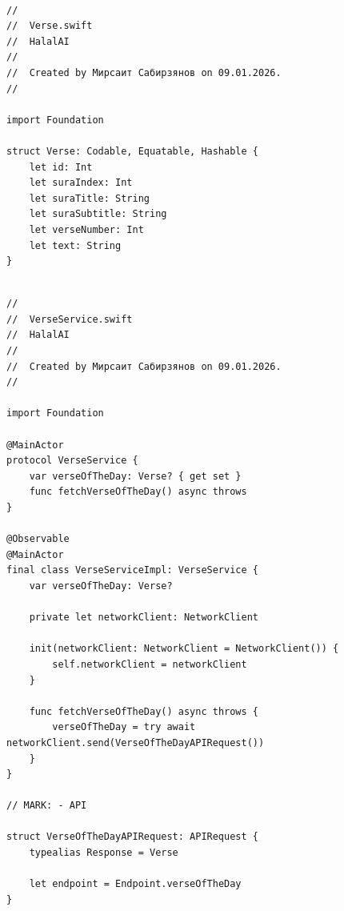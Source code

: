\begin{lstlisting}[basicstyle=\tiny\ttfamily,breaklines=true]

//
//  Verse.swift
//  HalalAI
//
//  Created by Мирсаит Сабирзянов on 09.01.2026.
//

import Foundation

struct Verse: Codable, Equatable, Hashable {
    let id: Int
    let suraIndex: Int
    let suraTitle: String
    let suraSubtitle: String
    let verseNumber: Int
    let text: String
}
\end{lstlisting}

\begin{lstlisting}[basicstyle=\tiny\ttfamily,breaklines=true]

//
//  VerseService.swift
//  HalalAI
//
//  Created by Мирсаит Сабирзянов on 09.01.2026.
//

import Foundation

@MainActor
protocol VerseService {
    var verseOfTheDay: Verse? { get set }
    func fetchVerseOfTheDay() async throws
}

@Observable
@MainActor
final class VerseServiceImpl: VerseService {
    var verseOfTheDay: Verse?

    private let networkClient: NetworkClient

    init(networkClient: NetworkClient = NetworkClient()) {
        self.networkClient = networkClient
    }

    func fetchVerseOfTheDay() async throws {
        verseOfTheDay = try await networkClient.send(VerseOfTheDayAPIRequest())
    }
}

// MARK: - API

struct VerseOfTheDayAPIRequest: APIRequest {
    typealias Response = Verse

    let endpoint = Endpoint.verseOfTheDay
}
\end{lstlisting}

